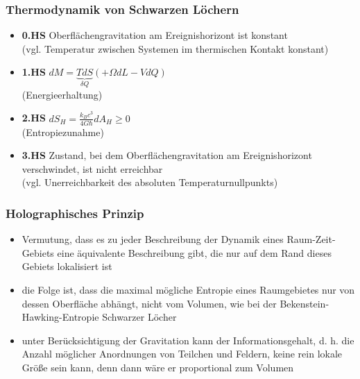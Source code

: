 \documentclass{beamer}
\begin{document}
\begin{frame}\frametitle{Thermodynamik von Schwarzen Löchern}

\begin{itemize}
\item \textbf{0.HS} Oberflächengravitation am Ereignishorizont ist konstant\\[.1cm](vgl. Temperatur zwischen Systemen im thermischen Kontakt konstant)\\[.25cm]
\item \textbf{1.HS} $dM = \underbrace{TdS}_{\delta Q} (+ \Omega dL - VdQ)$\\[.1cm](Energieerhaltung)\\[.25cm]
\item \textbf{2.HS} $dS_H = \frac{k_B c^3}{4G\hbar} dA_H \geq 0$\\[.1cm](Entropiezunahme)\\[.25cm]
\item \textbf{3.HS} Zustand, bei dem Oberflächengravitation am Ereignishorizont verschwindet, ist nicht erreichbar\\[.1cm](vgl. Unerreichbarkeit des absoluten Temperaturnullpunkts)
\end{itemize}

\end{frame}

\begin{frame}\frametitle{Holographisches Prinzip}

\begin{itemize}
\item Vermutung, dass es zu jeder Beschreibung der Dynamik eines Raum-Zeit-Gebiets eine äquivalente Beschreibung gibt, die nur auf dem Rand dieses Gebiets lokalisiert ist
\item die Folge ist, dass die maximal mögliche Entropie eines Raumgebietes nur von dessen Oberfläche abhängt, nicht vom Volumen, wie bei der Bekenstein-Hawking-Entropie Schwarzer Löcher
\item unter Berücksichtigung der Gravitation kann der \glqq Informationsgehalt\grqq, d. h. die Anzahl möglicher Anordnungen von Teilchen und Feldern, keine rein lokale Größe sein kann, denn dann wäre er proportional zum Volumen
\end{itemize}

\end{frame}
\end{document}
